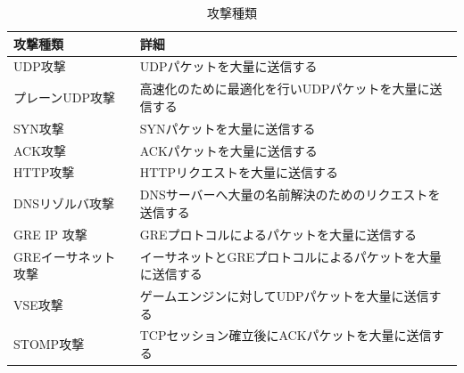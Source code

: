 \begin{table}[h]
   \caption{攻撃種類}
   \centering
   \label{tab:attack}
   \begin{tabular}{|l|l|}
   \hline
   攻撃種類                            & 詳細 \\ \hline \hline
   UDP攻撃                           &   UDPパケットを大量に送信する \\ \hline
   プレーンUDP攻撃                    & 高速化のために最適化を行いUDPパケットを大量に送信する   \\ \hline
   SYN攻撃                           &  SYNパケットを大量に送信する  \\ \hline
   ACK攻撃                           &  ACKパケットを大量に送信する  \\ \hline
   HTTP攻撃                          &  HTTPリクエストを大量に送信する  \\ \hline
   DNSリゾルバ攻撃                       &  DNSサーバーへ大量の名前解決のためのリクエストを送信する  \\ \hline
   GRE IP 攻撃                       &  GREプロトコルによるパケットを大量に送信する  \\ \hline
   GREイーサネット攻撃                     &  イーサネットとGREプロトコルによるパケットを大量に送信する  \\ \hline
   VSE攻撃                           &  ゲームエンジンに対してUDPパケットを大量に送信する  \\ \hline
   STOMP攻撃                         &  TCPセッション確立後にACKパケットを大量に送信する  \\ \hline
   \end{tabular}
\end{table}


